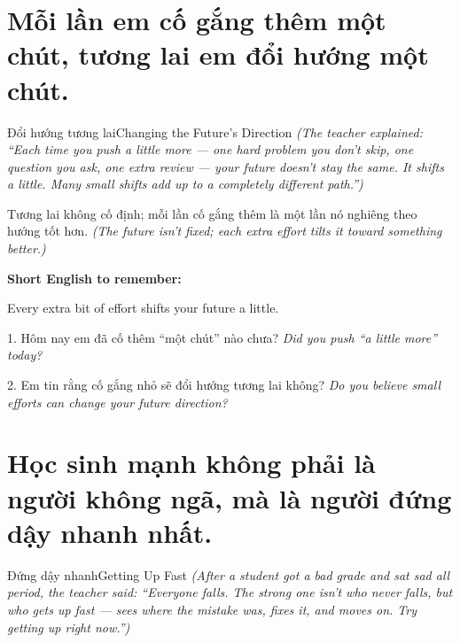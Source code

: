\section{Mỗi lần em cố gắng thêm một chút, tương lai em đổi hướng một chút.}
\begin{truyen}{Đổi hướng tương lai}{Changing the Future's Direction}
\textit{(The teacher explained: ``Each time you push a little more — one hard problem you don't skip, one question you ask, one extra review — your future doesn't stay the same. It shifts a little. Many small shifts add up to a completely different path.'')}
\end{truyen}

\begin{baihoc}
Tương lai không cố định; mỗi lần cố gắng thêm là một lần nó nghiêng theo hướng tốt hơn.
\textit{(The future isn't fixed; each extra effort tilts it toward something better.)}
\end{baihoc}

\begin{ghinhoanh}
\textbf{Short English to remember:}

Every extra bit of effort shifts your future a little.

\end{ghinhoanh}

\begin{tuhocnhanh}
1. Hôm nay em đã cố thêm ``một chút'' nào chưa? \textit{Did you push ``a little more'' today?}

2. Em tin rằng cố gắng nhỏ sẽ đổi hướng tương lai không? \textit{Do you believe small efforts can change your future direction?}
\end{tuhocnhanh}
\ngancach

\section{Học sinh mạnh không phải là người không ngã, mà là người đứng dậy nhanh nhất.}
\begin{truyen}{Đứng dậy nhanh}{Getting Up Fast}
\textit{(After a student got a bad grade and sat sad all period, the teacher said: ``Everyone falls. The strong one isn't who never falls, but who gets up fast — sees where the mistake was, fixes it, and moves on. Try getting up right now.'')}
\end{truyen}

